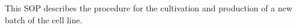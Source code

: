 This SOP describes the procedure for the cultivation and production of a new batch of the \Zellname\space cell line.
